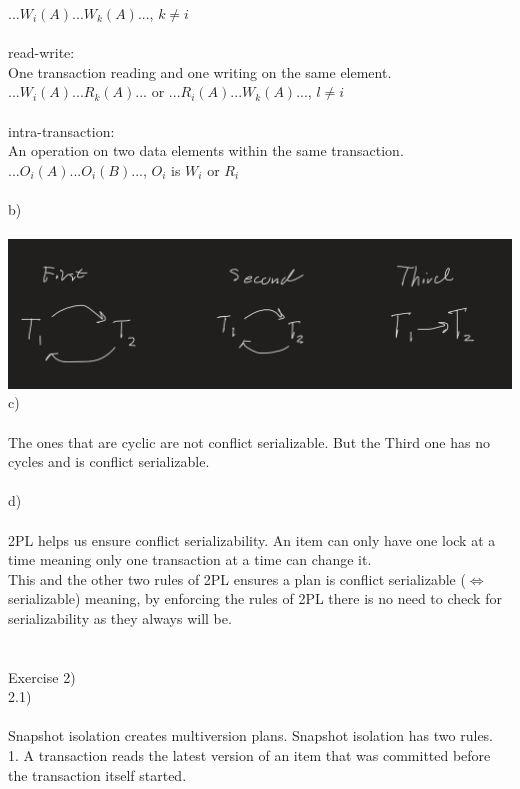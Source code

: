 \documentclass[12pt, letterpaper, twoside]{article}
\begin{document}
$...W_i(A)...W_k(A)...$, $k \neq i$\\
\ \\ 
read-write:\\
One transaction reading and one writing on the same element.\\
$...W_i(A)...R_k(A)...$ or $...R_i(A)...W_k(A)...$, $l \neq i$\\
\ \\
intra-transaction:\\
An operation on two data elements within the same transaction.\\
$...O_i(A)...O_i(B)...$, $O_i$ is $W_i$ or $R_i$\\
\ \\
b)\\
\ \\
\includegraphics[scale=0.5]{"Pre.png"}
c)\\
\ \\
The ones that are cyclic are not conflict serializable. But the Third one has no cycles and is conflict serializable.\\
\newpage
\ \\
d)\\
\ \\
2PL helps us ensure conflict serializability. An item can only have one lock at a time meaning only one transaction at a time can change it.\\ 
This and the other two rules of 2PL ensures a plan is conflict serializable ($\iff$ serializable) meaning, by enforcing the rules of 2PL there is no need to check for serializability as they always will be.\\
\ \\
\ \\
Exercise 2)\\
2.1)\\
\ \\
Snapshot isolation creates multiversion plans. Snapshot isolation has two rules.\\
1. A transaction reads the latest version of an item that was committed before the transaction itself started.\\
\end{document}
